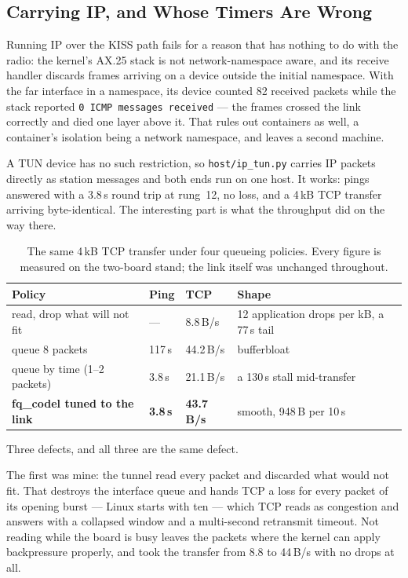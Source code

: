 \subsection{Carrying IP, and Whose Timers Are Wrong}
\label{sec:cport_iptun}

Running IP over the KISS path fails for a reason that has nothing to do
with the radio: the kernel's AX.25 stack is not network-namespace
aware, and its receive handler discards frames arriving on a device
outside the initial namespace.  With the far interface in a namespace,
its device counted 82 received packets while the stack reported
\texttt{0 ICMP messages received} --- the frames crossed the link
correctly and died one layer above it.  That rules out containers as
well, a container's isolation being a network namespace, and leaves a
second machine.

A TUN device has no such restriction, so \texttt{host/ip\_tun.py}
carries IP packets directly as station messages and both ends run on
one host.  It works: pings answered with a 3.8\,s round trip at
rung~12, no loss, and a 4\,kB TCP transfer arriving byte-identical.
The interesting part is what the throughput did on the way there.

\begin{table}[H]
    \centering
    \caption{The same 4\,kB TCP transfer under four queueing policies.
             Every figure is measured on the two-board stand; the link
             itself was unchanged throughout.}
    \label{tab:iptun}
    \small
    \begin{tabular}{@{}lllp{5.4cm}@{}}
    \toprule
    \textbf{Policy} & \textbf{Ping} & \textbf{TCP} & \textbf{Shape} \\
    \midrule
    read, drop what will not fit & --- & 8.8\,B/s &
    12 application drops per kB, a 77\,s tail \\
    queue 8 packets & 117\,s & 44.2\,B/s & bufferbloat \\
    queue by time (1--2 packets) & 3.8\,s & 21.1\,B/s &
    a 130\,s stall mid-transfer \\
    \textbf{fq\_codel tuned to the link} & \textbf{3.8\,s} &
    \textbf{43.7\,B/s} & smooth, 948\,B per 10\,s \\
    \bottomrule
    \end{tabular}
\end{table}

Three defects, and all three are the same defect.

The first was mine: the tunnel read every packet and discarded what
would not fit.  That destroys the interface queue and hands TCP a loss
for every packet of its opening burst --- Linux starts with ten ---
which TCP reads as congestion and answers with a collapsed window and a
multi-second retransmit timeout.  Not reading while the board is busy
leaves the packets where the kernel can apply backpressure properly,
and took the transfer from 8.8 to 44\,B/s with no drops at all.

